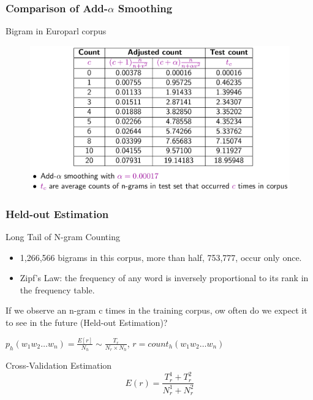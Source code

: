 \documentclass{beamer}
\begin{document}
\begin{frame}\frametitle{Comparison of Add-$\alpha$ Smoothing}

\begin{block}{Bigram in Europarl corpus}

\begin{figure}
\includegraphics[width=0.9\linewidth]{figure/bigram_alpha_smoothing.pdf}
\label{fig:bigram_alpha_smoothing}
\end{figure}

\end{block}
\end{frame}


\begin{frame}\frametitle{Held-out Estimation}

\begin{block}{Long Tail of N-gram Counting}
\begin{itemize}
\item 1,266,566 bigrams in this corpus, more than
half, 753,777, occur only once.
\item Zipf's Law:  the frequency of any word is inversely proportional to its rank in the frequency table. 
\end{itemize}

If we observe an n-gram
c times in the training corpus, ow often
do we expect it to see in the future (Held-out Estimation)?

$p_h(w_1w_2\ldots w_n) = \frac{E[r]}{N_h} \sim \frac{T_r}{N_r\times
  N_h}$,
$r = count_h(w_1w_2\ldots w_n)$
\end{block}

\begin{block}{Cross-Validation Estimation}
$$E(r) = \frac{T_r^1+T_r^2}{N_r^1+N_r^2}$$
\end{block}


\end{frame}
\end{document}
